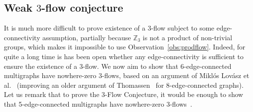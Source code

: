 \documentclass[12pt,twoside,openright,a4paper]{book}
\begin{document}
\subsection{Weak $3$-flow conjecture}\label{ssec:weak3flow}

It is much more difficult to prove existence of a $3$-flow subject to some edge-connectivity assumption, partially because
$\mathbb{Z}_3$ is not a product of non-trivial groups, which makes it impossible to use Observation~\ref{obs:prodflow}.
Indeed, for quite a long time is has been open whether any edge-connectivity is sufficient to ensure the existence of a $3$-flow.
We now aim to show that 6-edge-connected multigraphs have nowhere-zero $3$-flows, based on an argument of Mikl\'os Lov\'asz et al.~\cite{weak63}
(improving an older argument of Thomassen~\cite{weak83} for $8$-edge-connected graphs).
Let us remark that to prove the $3$-Flow Conjecture, it would be enough to show that 5-edge-connected multigraphs have nowhere-zero 3-flows~\cite{weak53eq}.
\end{document}
